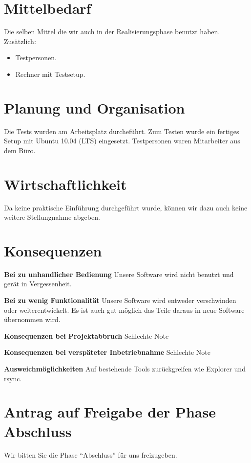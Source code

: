 \documentclass[10pt,paper=a4,final]{scrartcl}
\begin{document}
\section{Mittelbedarf}
Die selben Mittel die wir auch in der Realisierungsphase benutzt haben. Zusätzlich:\\
\begin{itemize}
  \item Testpersonen.
  \item Rechner mit Testsetup.
\end{itemize}
\section{Planung und Organisation}
Die Tests wurden am Arbeitsplatz durchef\"uhrt. Zum Testen wurde ein fertiges Setup mit Ubuntu 10.04 (LTS) eingesetzt. Testpersonen waren Mitarbeiter aus dem B\"uro.
\section{Wirtschaftlichkeit}
Da keine praktische Einführung durchgeführt wurde, können wir dazu auch keine weitere Stellungnahme abgeben.
\section{Konsequenzen}
\begin{description}
  \item{\bf Bei zu unhandlicher Bedienung} Unsere Software wird nicht benutzt und gerät in Vergessenheit.
  \item{\bf Bei zu wenig Funktionalität} Unsere Software wird entweder verschwinden oder weiterentwickelt. Es ist auch gut möglich das Teile daraus in neue Software übernommen wird.
  \item{\bf Konsequenzen bei Projektabbruch} Schlechte Note
  \item{\bf Konsequenzen bei verspäteter Inbetriebnahme} Schlechte Note
  \item{\bf Ausweichmöglichkeiten} Auf bestehende Tools zurückgreifen wie Explorer und rsync.
\end{description}
\section{Antrag auf Freigabe der Phase Abschluss}
Wir bitten Sie die  Phase “Abschluss” für uns freizugeben.
\end{document}
